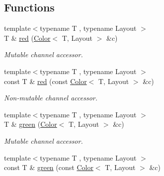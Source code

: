 \subsection*{Functions}
\begin{DoxyCompactItemize}
\item 
\hypertarget{group___channel_accessors_ga757afabac81c17de47404784d892fd3b}{{\footnotesize template$<$typename T , typename Layout $>$ }\\T \& \hyperlink{group___channel_accessors_ga757afabac81c17de47404784d892fd3b}{red} (\hyperlink{class_d_o_1_1_color}{Color}$<$ T, Layout $>$ \&c)}\label{group___channel_accessors_ga757afabac81c17de47404784d892fd3b}

\begin{DoxyCompactList}\small\item\em Mutable channel accessor. \end{DoxyCompactList}\item 
\hypertarget{group___channel_accessors_gaeb571624f9083b6e93caa612efbe33d5}{{\footnotesize template$<$typename T , typename Layout $>$ }\\const T \& \hyperlink{group___channel_accessors_gaeb571624f9083b6e93caa612efbe33d5}{red} (const \hyperlink{class_d_o_1_1_color}{Color}$<$ T, Layout $>$ \&c)}\label{group___channel_accessors_gaeb571624f9083b6e93caa612efbe33d5}

\begin{DoxyCompactList}\small\item\em Non-\/mutable channel accessor. \end{DoxyCompactList}\item 
\hypertarget{group___channel_accessors_gae8bbbd63c7f0aab610b1dd591b415519}{{\footnotesize template$<$typename T , typename Layout $>$ }\\T \& \hyperlink{group___channel_accessors_gae8bbbd63c7f0aab610b1dd591b415519}{green} (\hyperlink{class_d_o_1_1_color}{Color}$<$ T, Layout $>$ \&c)}\label{group___channel_accessors_gae8bbbd63c7f0aab610b1dd591b415519}

\begin{DoxyCompactList}\small\item\em Mutable channel accessor. \end{DoxyCompactList}\item 
\hypertarget{group___channel_accessors_ga5bfc09b28f0f9052e3c133581f6667c3}{{\footnotesize template$<$typename T , typename Layout $>$ }\\const T \& \hyperlink{group___channel_accessors_ga5bfc09b28f0f9052e3c133581f6667c3}{green} (const \hyperlink{class_d_o_1_1_color}{Color}$<$ T, Layout $>$ \&c)}\label{group___channel_accessors_ga5bfc09b28f0f9052e3c133581f6667c3}


\end{DoxyCompactItemize}
